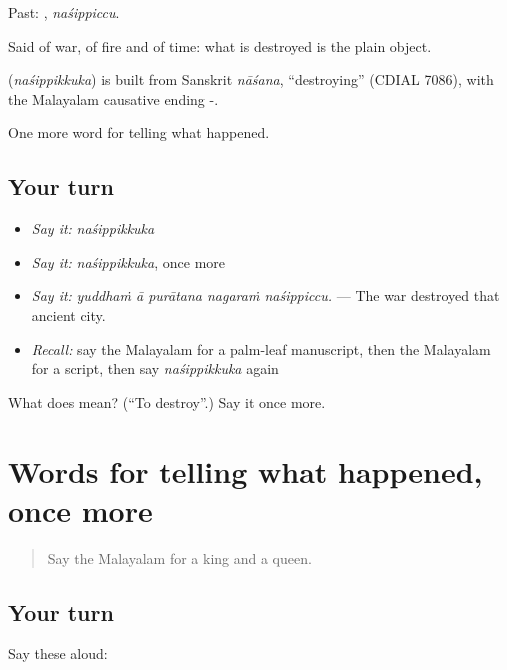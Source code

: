 Past: , \emph{naśippiccu}.

Said of war, of fire and of time: what is destroyed is the plain object.

\begin{cousinweb}
\textbf{} (\emph{naśippikkuka}) is built from Sanskrit \emph{nāśana}, \textquotedblleft{}destroying\textquotedblright{} (CDIAL 7086), with the Malayalam causative ending -.
\end{cousinweb}

\begin{grammarlens}[title={What you've built}]
One more word for telling what happened.
\end{grammarlens}

\subsection*{Your turn}
\begin{itemize}
\raggedright
  \item \emph{Say it:} \emph{naśippikkuka}
  \item \emph{Say it:} \emph{naśippikkuka}, once more
  \item \emph{Say it:} \emph{yuddhaṁ ā purātana nagaraṁ naśippiccu.} — The war destroyed that ancient city.
  \item \emph{Recall:} say the Malayalam for a palm-leaf manuscript, then the Malayalam for a script, then say \emph{naśippikkuka} again
\end{itemize}

\begin{tcolorbox}[breakable,colback=teal!4,colframe=teal!35!black,title={Before you move on}]
What does  mean? (\textquotedblleft{}To destroy\textquotedblright{}.) Say it once more.
\end{tcolorbox}
\section[(dialogue)]{Words for telling what happened, once more}

\label{lesson:ML-R404-review-397-404}



\begin{quote}
Say the Malayalam for a king and a queen.
\end{quote}

\subsection*{Your turn}
Say these aloud:

